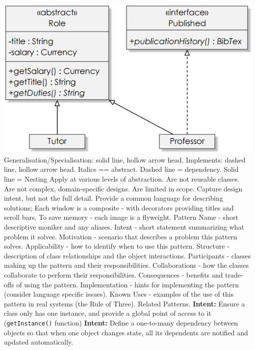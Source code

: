 \documentclass[number]{assignment}
\begin{document}
\begin{landscape}
\begin{multicols}{3}
\includegraphics[width=\linewidth]{inheritance.png}
Generalisation/Specialisation: solid line, hollow arrow head. Implements: dashed line, hollow arrow head. Italics == abstract.
Dashed line = dependency. Solid line = Nesting
Apply at various levels of abstraction. Are not reusable classes. Are not complex, domain-specific designs. Are limited in scope. Capture design intent, but not the full detail.
Provide a common language for describing solutions; Each window is a composite - with decorators providing titles and scroll bars, To save memory - each image is a flyweight.
Pattern Name - short descriptive moniker and any aliases. Intent - short statement summarizing what problem it solves. Motivation - scenario that describes a problem this pattern solves. Applicability - how to identify when to use this pattern. Structure - description of class relationships and the object interactions. Participants - classes making up the pattern and their responsibilities. Collaborations - how the classes collaborate to perform their responsibilities. Consequences - benefits and trade-offs of using the pattern. Implementation - hints for implementing the pattern (consider language specific issues). Known Uses - examples of the use of this pattern in real systems (the Rule of Three). Related Patterns.
\textbf{Intent:} Ensure a class only has one instance, and provide a global point of access to it (\texttt{getInstance()} function)
\textbf{Intent:} Define a one-to-many dependency between objects so that when one object changes state, all its dependents are notified and updated automatically.\\

\end{multicols}
\end{landscape}
\end{document}
